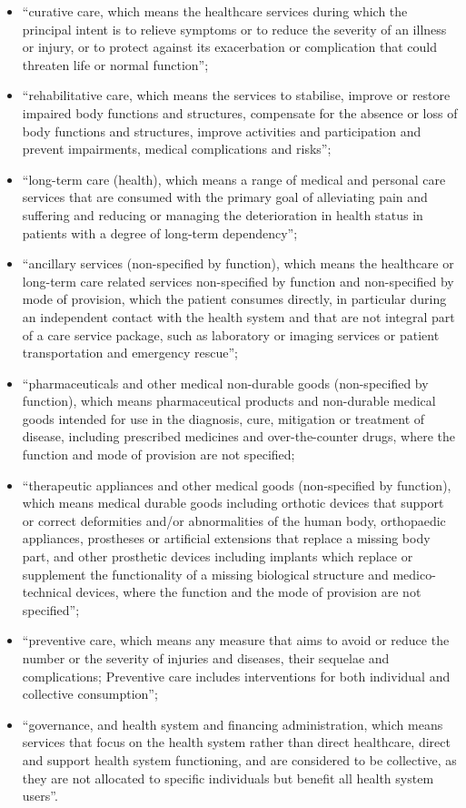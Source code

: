 \documentclass[a4paper,12pt]{article}
\begin{document}
\begin{enumerate}
\begin{itemize}
\item ``curative care, which means the healthcare services during which the principal intent is to relieve symptoms or to reduce the severity of an illness or injury, or to protect against its exacerbation or complication that could threaten life or normal function'';
\item ``rehabilitative care, which means the services to stabilise, improve or restore impaired body functions and structures, compensate for the absence or loss of body functions and structures, improve activities and participation and prevent impairments, medical complications and risks'';
\item ``long-term care (health), which means a range of medical and personal care services that are consumed with the primary goal of alleviating pain and suffering and reducing or managing the deterioration in health status in patients with a degree of long-term dependency'';
\item ``ancillary services (non-specified by function), which means the healthcare or long-term care related services non-specified by function and non-specified by mode of provision, which the patient consumes directly, in particular during an independent contact with the health system and that are not integral part of a care service package, such as laboratory or imaging services or patient transportation and emergency rescue'';
\item ``pharmaceuticals and other medical non-durable goods (non-specified by function), which means pharmaceutical products and non-durable medical goods intended for use in the diagnosis, cure, mitigation or treatment of disease, including prescribed medicines and over-the-counter drugs, where the function and mode of provision are not specified;
\item ``therapeutic appliances and other medical goods (non-specified by function), which means medical durable goods including orthotic devices that support or correct deformities and/or abnormalities of the human body, orthopaedic appliances, prostheses or artificial extensions that replace a missing body part, and other prosthetic devices including implants which replace or supplement the functionality of a missing biological structure and medico-technical devices, where the function and the mode of provision are not specified'';
\item ``preventive care, which means any measure that aims to avoid or reduce the number or the severity of injuries and diseases, their sequelae and complications; Preventive care includes interventions for both individual and collective consumption'';
\item ``governance, and health system and financing administration, which means services that focus on the health system rather than direct healthcare, direct and support health system functioning, and are considered to be collective, as they are not allocated to specific individuals but benefit all health system users''.
\end{itemize}


\end{enumerate}
\end{document}
